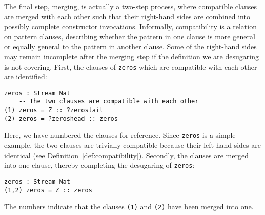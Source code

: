 

The final step, merging, is actually a two-step process, where compatible
clauses are merged with each other such that their right-hand sides are combined
into possibly complete constructor invocations. Informally, compatibility is a relation on
pattern clauses, describing whether the pattern in one clause is more general or
equally general to the pattern in another clause. Some of the right-hand sides
may remain incomplete after the merging step if the definition we are desugaring
is not covering. First, the clauses of \texttt{zeros} which are compatible with
each other are identified:
\begin{lstlisting}[mathescape,title=\idrisBlock]
    zeros : Stream Nat
    -- The two clauses are compatible with each other
(1) zeros = Z :: ?zerostail
(2) zeros = ?zeroshead :: zeros
\end{lstlisting}
Here, we have numbered the clauses for reference. Since \texttt{zeros} is a simple
example, the two clauses are trivially compatible because their left-hand sides
are identical (see Definition~\ref{def:compatibility}). Secondly, the clauses are merged into one clause, thereby completing the
desugaring of \texttt{zeros}:
\begin{lstlisting}[mathescape,title=\idrisBlock]
      zeros : Stream Nat
(1,2) zeros = Z :: zeros 
\end{lstlisting}
The numbers indicate that the clauses \texttt{(1)} and \texttt{(2)} have been
merged into one.

